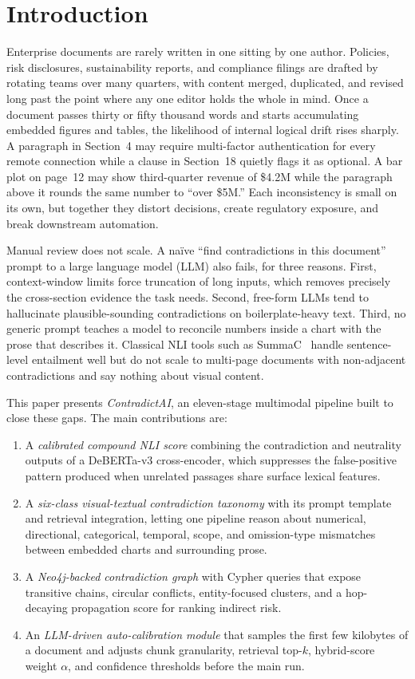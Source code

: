 \documentclass[conference]{IEEEtran}
\begin{document}
\section{Introduction}
Enterprise documents are rarely written in one sitting by one author. Policies, risk disclosures, sustainability reports, and compliance filings are drafted by rotating teams over many quarters, with content merged, duplicated, and revised long past the point where any one editor holds the whole in mind. Once a document passes thirty or fifty thousand words and starts accumulating embedded figures and tables, the likelihood of internal logical drift rises sharply. A paragraph in Section~4 may require multi-factor authentication for every remote connection while a clause in Section~18 quietly flags it as optional. A bar plot on page~12 may show third-quarter revenue of \$4.2M while the paragraph above it rounds the same number to ``over \$5M.'' Each inconsistency is small on its own, but together they distort decisions, create regulatory exposure, and break downstream automation.

Manual review does not scale. A na\"{i}ve ``find contradictions in this document'' prompt to a large language model (LLM) also fails, for three reasons. First, context-window limits force truncation of long inputs, which removes precisely the cross-section evidence the task needs. Second, free-form LLMs tend to hallucinate plausible-sounding contradictions on boilerplate-heavy text. Third, no generic prompt teaches a model to reconcile numbers inside a chart with the prose that describes it. Classical NLI tools such as SummaC~\cite{b1} handle sentence-level entailment well but do not scale to multi-page documents with non-adjacent contradictions and say nothing about visual content.

This paper presents \emph{ContradictAI}, an eleven-stage multimodal pipeline built to close these gaps. The main contributions are:
\begin{enumerate}
    \item A \emph{calibrated compound NLI score} combining the contradiction and neutrality outputs of a DeBERTa-v3 cross-encoder, which suppresses the false-positive pattern produced when unrelated passages share surface lexical features.
    \item A \emph{six-class visual-textual contradiction taxonomy} with its prompt template and retrieval integration, letting one pipeline reason about numerical, directional, categorical, temporal, scope, and omission-type mismatches between embedded charts and surrounding prose.
    \item A \emph{Neo4j-backed contradiction graph} with Cypher queries that expose transitive chains, circular conflicts, entity-focused clusters, and a hop-decaying propagation score for ranking indirect risk.
    \item An \emph{LLM-driven auto-calibration module} that samples the first few kilobytes of a document and adjusts chunk granularity, retrieval top-$k$, hybrid-score weight $\alpha$, and confidence thresholds before the main run.
\end{enumerate}
\end{document}
